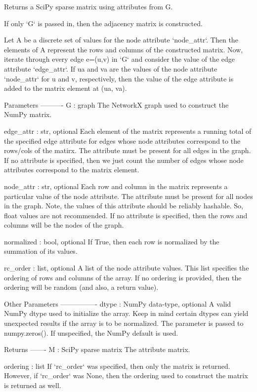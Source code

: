 \begin{DoxyVerb}Returns a SciPy sparse matrix using attributes from G.

If only `G` is passed in, then the adjacency matrix is constructed.

Let A be a discrete set of values for the node attribute `node_attr`. Then
the elements of A represent the rows and columns of the constructed matrix.
Now, iterate through every edge e=(u,v) in `G` and consider the value
of the edge attribute `edge_attr`.  If ua and va are the values of the
node attribute `node_attr` for u and v, respectively, then the value of
the edge attribute is added to the matrix element at (ua, va).

Parameters
----------
G : graph
    The NetworkX graph used to construct the NumPy matrix.

edge_attr : str, optional
    Each element of the matrix represents a running total of the
    specified edge attribute for edges whose node attributes correspond
    to the rows/cols of the matirx. The attribute must be present for
    all edges in the graph. If no attribute is specified, then we
    just count the number of edges whose node attributes correspond
    to the matrix element.

node_attr : str, optional
    Each row and column in the matrix represents a particular value
    of the node attribute.  The attribute must be present for all nodes
    in the graph. Note, the values of this attribute should be reliably
    hashable. So, float values are not recommended. If no attribute is
    specified, then the rows and columns will be the nodes of the graph.

normalized : bool, optional
    If True, then each row is normalized by the summation of its values.

rc_order : list, optional
    A list of the node attribute values. This list specifies the ordering
    of rows and columns of the array. If no ordering is provided, then
    the ordering will be random (and also, a return value).

Other Parameters
----------------
dtype : NumPy data-type, optional
    A valid NumPy dtype used to initialize the array. Keep in mind certain
    dtypes can yield unexpected results if the array is to be normalized.
    The parameter is passed to numpy.zeros(). If unspecified, the NumPy
    default is used.

Returns
-------
M : SciPy sparse matrix
    The attribute matrix.

ordering : list
    If `rc_order` was specified, then only the matrix is returned.
    However, if `rc_order` was None, then the ordering used to construct
    the matrix is returned as well.


\end{DoxyVerb}
